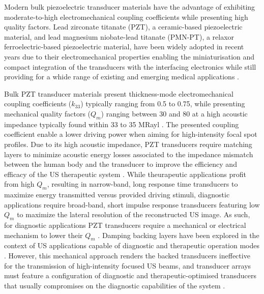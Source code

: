 Modern bulk piezoelectric transducer materials have the advantage of exhibiting moderate-to-high electromechanical coupling coefficients while presenting high quality factors. Lead zirconate titanate (PZT), a ceramic-based piezoelectric material, and lead magnesium niobate-lead titanate (PMN-PT), a relaxor ferroelectric-based piezoelectric material, have been widely adopted in recent years due to their electromechanical properties enabling the miniaturisation and compact integration 
of the transducers with the interfacing electronics while still providing for a whide range of existing and emerging medical applications \cite{https://iopscience.iop.org/article/10.1088/1361-6463/ac8687}. 

Bulk PZT transducer materials present thickness-mode electromechanical coupling coefficients 
($k_{33}$) typically ranging from 0.5 to 0.75, while presenting mechanical 
quality factors ($Q_m$) ranging between 30 and 80 at a high acoustic impedance 
typically found within 33 to 35 MRayl \cite{https://link.springer.com/book/10.1007/978-0-387-76540-2 Fig 10.12} 
\cite{https://iopscience.iop.org/article/10.1088/1361-6463/ac8687}.
The presented coupling coefficient enable a lower driving power when 
aiming for high-intensity focal spot profiles. Due to its high acoustic impedance, 
PZT transducers require matching layers to minimize acoustic 
energy losses associated to the impedance mismatch between the human body 
and the transducer to improve the efficiency and efficacy of the 
US therapeutic system \cite{https://pubmed.ncbi.nlm.nih.gov/32708159/} \cite{https://www.nature.com/articles/srep42863}.
While theurapeutic applications profit from high $Q_m$, resulting in narrow-band, 
long response time transducers to maximize energy transmitted versus 
provided driving stimuli, diagnostic applications require broad-band, 
short impulse response transducers featuring low $Q_m$ to maximize the 
lateral resolution of the reconstructed US image. As such, for diagnostic 
applications PZT transducers require a mechanical or electrical mechanism to lower 
their $Q_m$ \cite{}\cite{}. Damping backing layers have been explored 
in the context of US applications capable of diagnostic and therapeutic operation modes \cite{}. 
However, this mechanical approach renders the backed transducers ineffective 
for the transmission of high-intensity focused US beams, and transducer arrays 
must feature a configuration of diagnostic and therapeutic-optimised transducers 
that usually compromises on the diagnostic capabilities of the system 
\cite{Hassan Random distribution}\cite{Chao Chen Cross}.
